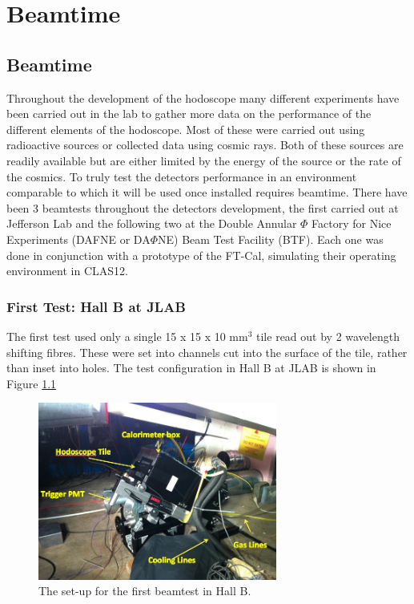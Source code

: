 \chapter{Beamtime}

\section{Beamtime}

Throughout the development of the hodoscope many different experiments have been carried out in the lab to gather more data on the performance of the different elements of the hodoscope. Most of these were carried out using radioactive sources or collected data using cosmic rays. Both of these sources are readily available but are either limited by the energy of the source or the rate of the cosmics. To truly test the detectors performance in an environment comparable to which it will be used once installed requires beamtime. There have been 3 beamtests throughout the detectors development, the first carried out at Jefferson Lab and the following two at the Double Annular $\Phi$  Factory for Nice Experiments (DAFNE or DA$\Phi$NE) Beam Test Facility (BTF). Each one was done in conjunction with a prototype of the FT-Cal, simulating their operating environment in CLAS12.

\subsection{First Test: Hall B at JLAB}

The first test used only a single 15 x 15 x 10 mm$^{3}$ tile read out by 2 wavelength shifting fibres. These were set into channels cut into the surface of the tile, rather than inset into holes. The test configuration in Hall B at JLAB is shown in Figure \ref{HallBTestSetup}

\begin{figure}
	\centering
	\includegraphics[width=0.7\textwidth]{ImgChap1/firsttest}
	\caption{The set-up for the first beamtest in Hall B.}
	\label{HallBTestSetup}
\end{figure}

